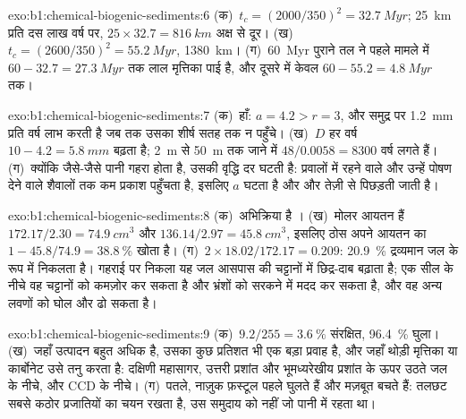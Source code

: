 \begin{solution}{exo:b1:chemical-biogenic-sediments:6}
(क)~$t_c = (2000/350)^2 = \qty{32.7}{Myr}$; \qty{25}{km} प्रति दस लाख वर्ष पर, $25\times32.7 = \qty{816}{km}$ अक्ष से दूर। (ख)~$t_c = (2600/350)^2 =
\qty{55.2}{Myr}$, \qty{1380}{km}। (ग)~\qty{60}{Myr} पुराने तल ने पहले मामले में $60 - 32.7 = \qty{27.3}{Myr}$ तक लाल मृत्तिका पाई है, और दूसरे में केवल $60 - 55.2 = \qty{4.8}{Myr}$ तक।
\end{solution}

\begin{solution}{exo:b1:chemical-biogenic-sediments:7}
(क)~हाँ: $a = 4.2 > r = 3$, और  समुद्र पर \qty{1.2}{mm} प्रति वर्ष लाभ करती है जब तक उसका शीर्ष सतह तक न पहुँचे। (ख)~$D$ हर वर्ष $10 - 4.2 = \qty{5.8}{mm}$ बढ़ता है; \qty{2}{m} से \qty{50}{m} तक जाने में $48/0.0058 = \num{8300}$ वर्ष लगते हैं। (ग)~क्योंकि जैसे-जैसे पानी गहरा होता है, उसकी वृद्धि दर घटती है: प्रवालों में रहने वाले और उन्हें पोषण देने वाले शैवालों तक कम प्रकाश पहुँचता है, इसलिए $a$ घटता है और  और तेज़ी से पिछड़ती जाती है।
\end{solution}

\begin{solution}{exo:b1:chemical-biogenic-sediments:8}
(क)~अभिक्रिया है । (ख)~मोलर आयतन हैं $172.17/2.30 =
\qty{74.9}{cm^3}$ और $136.14/2.97 = \qty{45.8}{cm^3}$, इसलिए ठोस अपने आयतन का $1 - 45.8/74.9 = \qty{38.8}{\%}$ खोता है। (ग)~$2\times18.02/172.17 = 0.209$: \qty{20.9}{\%} द्रव्यमान जल के रूप में निकलता है। गहराई पर निकला यह जल आसपास की चट्टानों में छिद्र-दाब बढ़ाता है; एक सील के नीचे वह चट्टानों को कमज़ोर कर सकता है और भ्रंशों को सरकने में मदद कर सकता है, और वह अन्य लवणों को घोल और ढो सकता है।
\end{solution}

\begin{solution}{exo:b1:chemical-biogenic-sediments:9}
(क)~$9.2/255 = \qty{3.6}{\%}$ संरक्षित, \qty{96.4}{\%} घुला। (ख)~जहाँ उत्पादन बहुत अधिक है, उसका कुछ प्रतिशत भी एक बड़ा प्रवाह है, और जहाँ थोड़ी मृत्तिका या कार्बोनेट उसे तनु करता है: दक्षिणी महासागर, उत्तरी प्रशांत और भूमध्यरेखीय प्रशांत के ऊपर उठते जल के नीचे, और CCD के नीचे। (ग)~पतले, नाज़ुक फ़स्टूल पहले घुलते हैं और मज़बूत बचते हैं: तलछट सबसे कठोर प्रजातियों का चयन रखता है, उस समुदाय को नहीं जो पानी में रहता था।
\end{solution}

